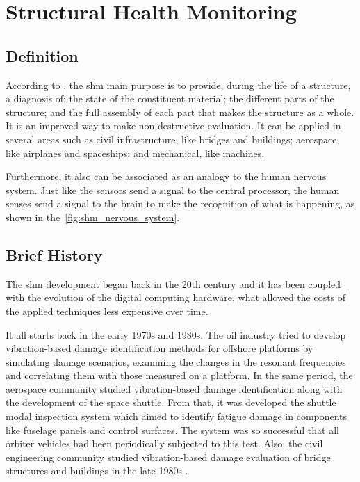 \section{Structural Health Monitoring}

\subsection{Definition}

According to  \citet{balageas2010}, the \gls*{shm} main purpose is to provide, during the life of a structure,  a diagnosis of: the state of the constituent material; the different parts of the structure; and the full assembly of each part that makes the structure as a whole. 
It is an improved way to make non-destructive evaluation.
It can be applied in several areas such as civil infrastructure, like bridges and buildings; aerospace, like airplanes and spaceships; and mechanical, like machines.

Furthermore, it also can be associated as an analogy to the human nervous system. 
Just like the sensors send a signal to the central processor, the human senses send a signal to the brain to make the recognition of what is happening, as shown in the~\cref{fig:shm_nervous_system}.

\subsection{Brief History}

The \gls*{shm} development began back in the 20th century and it has been coupled with the evolution of the digital computing hardware, what allowed the costs of the applied techniques less expensive over time.

It all starts back in the early 1970s and 1980s. 
The oil industry tried to develop vibration-based damage identification methods for offshore platforms by simulating damage scenarios, examining the changes in the resonant frequencies and correlating them with those measured on a platform.
In the same period, the aerospace community studied vibration-based damage identification along with the development of the space shuttle. 
From that, it was developed the shuttle modal inspection system which aimed to identify fatigue damage in components like fuselage panels and control surfaces. The system was so successful that all orbiter vehicles had been periodically subjected to this test.
Also, the civil engineering community studied vibration-based damage evaluation of bridge structures and buildings in the late 1980s \citep{farrar2007}.

